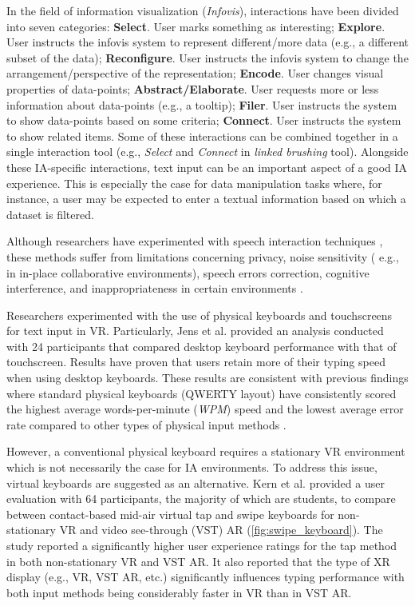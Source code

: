 \documentclass{vgtc}                          %
\begin{document}
\noindent In the field of information visualization (\textit{Infovis}), interactions have been divided into seven
categories: \textbf{Select}. User marks something as interesting; \textbf{Explore}. User instructs the
infovis system to represent different/more data (e.g., a different subset of the data);
\textbf{Reconfigure}. User instructs the infovis system to change the arrangement/perspective of the
representation; \textbf{Encode}. User changes visual properties of data-points; \textbf{Abstract/Elaborate}.
User requests more or less information about data-points (e.g., a tooltip); \textbf{Filer}. User instructs the
system to show data-points based on some criteria; \textbf{Connect}. User instructs the system to show related
items. Some of these interactions can be combined together in a single interaction tool (e.g., \textit{Select}
and \textit{Connect} in \textit{linked brushing} tool).
Alongside these IA-specific interactions, text input can be an important aspect of a good IA
experience. This is especially the case for data manipulation tasks where, for instance, a user may be
expected to enter a textual information based on which a dataset is filtered.

\medskip

\noindent Although researchers have experimented with speech interaction techniques
\cite{wizualization_toolkit}, these methods suffer from limitations concerning privacy, noise sensitivity (
e.g., in in-place collaborative environments), speech errors correction, cognitive interference, and
inappropriateness in certain environments \cite{limits_of_speech_recognition}.

\medskip

\noindent Researchers experimented with the use of physical keyboards and touchscreens for text input
in VR. Particularly, Jens et al. \cite{keyboard_vs_touchscreen} provided an analysis conducted with 24
participants that compared desktop keyboard performance with that of touchscreen. Results have proven that
users retain more of their typing speed when using desktop keyboards.
These results are consistent with previous findings where standard physical keyboards
(QWERTY layout) have consistently scored the highest average words-per-minute (\textit{WPM}) speed and the
lowest average error rate compared to other types of physical input methods \cite{physical_text_entry_comparison}.

\medskip

\noindent However, a conventional physical keyboard requires a stationary VR environment which is not necessarily the
case for IA environments. To address this issue, virtual keyboards are suggested as an alternative. Kern et
al. \cite{tap_vs_word_gesture_keyboards} provided a user evaluation with 64 participants, the majority of
which are students, to compare between contact-based mid-air virtual tap and swipe keyboards for
non-stationary VR and video see-through (VST) AR (\autoref{fig:swipe_keyboard}). The study reported a
significantly higher user experience ratings for the tap method in both non-stationary VR and VST AR. It also
reported that the type of XR display (e.g., VR, VST AR, etc.) significantly influences typing performance
with both input methods being considerably faster in VR than in VST AR.
\end{document}
